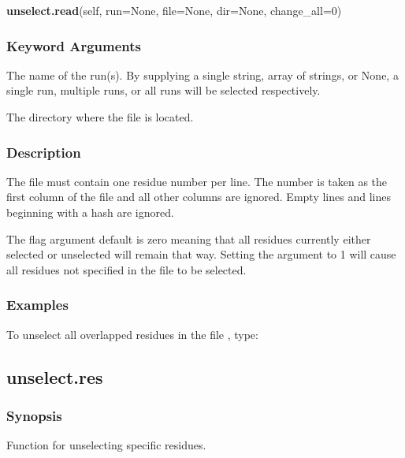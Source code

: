 \textsf{\textbf{unselect.read}(self, run=None, file=None, dir=None, change\_all=0)}


\subsubsection{Keyword Arguments}

  The name of the run(s).  By supplying a single string, array of strings, or None, a single run, multiple runs, or all runs will be selected respectively.

  The directory where the file is located.


\subsubsection{Description}

The file must contain one residue number per line.  The number is taken as the first column
of the file and all other columns are ignored.  Empty lines and lines beginning with a hash
are ignored.

The 
 flag argument default is zero meaning that all residues currently either
selected or unselected will remain that way.  Setting the argument to 1 will cause all
residues not specified in the file to be selected.


\subsubsection{Examples}

To unselect all overlapped residues in the file 
, type:





\newpage

\subsection{unselect.res}


\subsubsection{Synopsis}

Function for unselecting specific residues.

